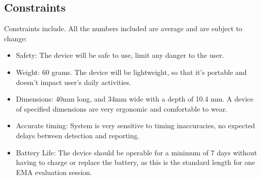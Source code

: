 \documentclass[12pt]{article}
\begin{document}
\subsection{Constraints}
Constraints include. All the numbers included are average and are subject to change:
\begin{itemize}
    \item Safety: The device will be safe to use, limit any danger to the user.
    \item Weight: 60 grams. The device will be lightweight, so that it's portable and doesn't impact user's daily activities.
    \item Dimensions: 40mm long, and 34mm wide with a depth of 10.4 mm. A device of specified dimensions are very ergonomic and comfortable to wear.
    \item Accurate timing: System is very sensitive to timing inaccuracies, no \linebreak expected delays between detection and reporting.
    \item Battery Life: The device should be operable for a minimum of 7 days without having to charge or replace the battery, as this is the standard length for one EMA evaluation session.
\end{itemize}

\pagebreak
\end{document}
